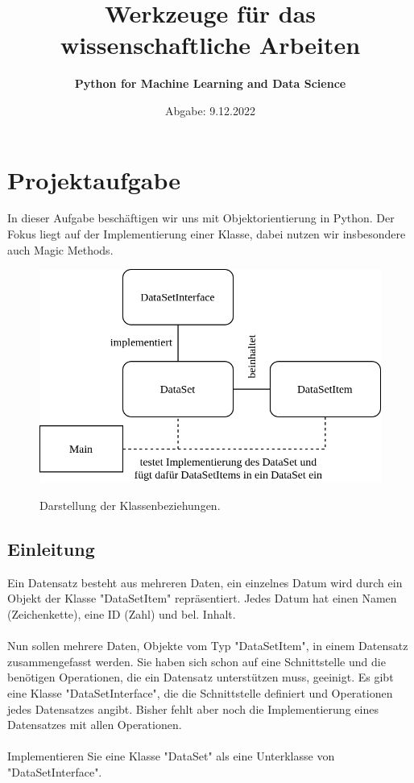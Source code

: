 \documentclass{article}
\begin{document}
	\title{\bf Werkzeuge für das wissenschaftliche Arbeiten}
	\author{\bf Python for Machine Learning and Data Science}
	\date{Abgabe: 9.12.2022}
	\maketitle

	\tableofcontents

	\section{Projektaufgabe}

		In dieser Aufgabe beschäftigen wir uns mit Objektorientierung in Python.
		Der Fokus liegt auf der Implementierung einer Klasse, dabei nutzen wir insbesondere auch Magic Methods. 

		\begin{figure}
			\centering
			\includegraphics[scale=0.30]{../diagram/classes_files.png}
			\bf\caption{\normalfont Darstellung der Klassenbeziehungen.} 
		\end{figure}

		\subsection{Einleitung}

			Ein Datensatz besteht aus mehreren Daten, ein einzelnes Datum wird durch ein Objekt der Klasse "DataSetItem" repräsentiert.
			Jedes Datum hat einen Namen (Zeichenkette), eine ID (Zahl) und bel. Inhalt.\\
			\\
			Nun sollen mehrere Daten, Objekte vom Typ "DataSetItem", in einem Datensatz zusammengefasst werden.
			Sie haben sich schon auf eine Schnittstelle und die benötigen Operationen, die ein Datensatz unterstützen muss, geeinigt.
			Es gibt eine Klasse "DataSetInterface", die die Schnittstelle definiert und Operationen jedes Datensatzes angibt.
			Bisher fehlt aber noch die Implementierung eines Datensatzes mit allen Operationen.\\
			\\
			Implementieren Sie eine Klasse "DataSet" als eine Unterklasse von "DataSetInterface".\\
\end{document}
